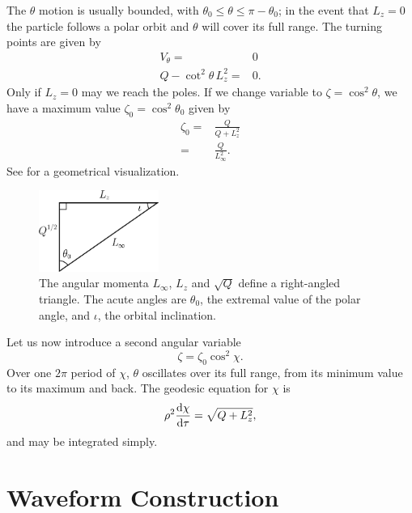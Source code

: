 The $\theta$ motion is usually bounded, with $\theta_0 \leq \theta \leq \pi - \theta_0$; in the event that $L_z = 0$ the particle follows a polar orbit and $\theta$ will cover its full range. The turning points are given by
\begin{align}
V_\theta = {} & 0 \nonumber \\
Q - \cot^2\theta\, L_z^2= {} & 0.
\end{align}
Only if $L_z = 0$ may we reach the poles\cite{Wilkins1972}. If we change variable to $\zeta = \cos^2\theta$, we have a maximum value $\zeta_0 = \cos^2\theta_0$ given by
\begin{align}
\label{eq:theta_0}
\zeta_0 = {} & \frac{Q}{Q+L_z^2}\\
 = {} & \frac{Q}{L_\infty^2}.
\end{align}
See  for a geometrical visualization.
\begin{figure}[tbp]
\begin{center}
\includegraphics[width=0.35\textwidth]{./Images/Triangle.eps}
    \caption{The angular momenta $L_\infty$, $L_z$ and $\sqrt{Q}$ define a right-angled triangle. The acute angles are $\theta_0$, the extremal value of the polar angle, and $\iota$, the orbital inclination\cite{Glampedakis2002a}.}
   \label{fig:L_triangle}
\end{center}
\end{figure}
Let us now introduce a second angular variable\cite{Drasco2004}
\begin{equation}
\zeta = \zeta_0\cos^2\chi.
\end{equation}
Over one $2\pi$ period of $\chi$, $\theta$ oscillates over its full range, from its minimum value to its maximum and back. The geodesic equation for $\chi$ is
\begin{equation}
\rho^2\frac{\mathrm{d} {\chi}}{\mathrm{d} {\tau}} = \sqrt{Q + L_z^2},
\end{equation}
and may be integrated simply.

\section{Waveform Construction}

